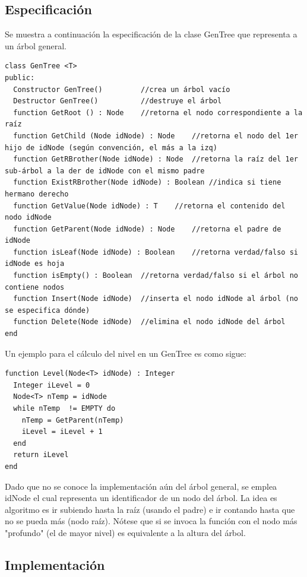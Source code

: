 \subsection{Especificación}

Se muestra a continuación la especificación de la clase GenTree que representa a un árbol general.

\begin{lstlisting}[upquote=true, language=pseudo]
class GenTree <T>
public:
  Constructor GenTree()			//crea un árbol vacío
  Destructor GenTree()			//destruye el árbol 
  function GetRoot () : Node	//retorna el nodo correspondiente a la raíz
  function GetChild (Node idNode) : Node	//retorna el nodo del 1er hijo de idNode (según convención, el más a la izq)
  function GetRBrother(Node idNode) : Node	//retorna la raíz del 1er sub-árbol a la der de idNode con el mismo padre
  function ExistRBrother(Node idNode) : Boolean	//indica si tiene hermano derecho
  function GetValue(Node idNode) : T	//retorna el contenido del nodo idNode
  function GetParent(Node idNode) : Node	//retorna el padre de idNode
  function isLeaf(Node idNode) : Boolean	//retorna verdad/falso si idNode es hoja
  function isEmpty() : Boolean	//retorna verdad/falso si el árbol no contiene nodos
  function Insert(Node idNode)	//inserta el nodo idNode al árbol (no se especifica dónde)
  function Delete(Node idNode)	//elimina el nodo idNode del árbol
end
\end{lstlisting}

Un ejemplo para el cálculo del nivel en un GenTree es como sigue:

\begin{lstlisting}[upquote=true, language=pseudo]
function Level(Node<T> idNode) : Integer
  Integer iLevel = 0
  Node<T> nTemp = idNode
  while nTemp  != EMPTY do
    nTemp = GetParent(nTemp)
    iLevel = iLevel + 1
  end
  return iLevel
end
\end{lstlisting}

Dado que no se conoce la implementación aún del árbol general, se emplea idNode el cual representa un identificador de un nodo del árbol. La idea es algoritmo es ir subiendo hasta la raíz (usando el padre) e ir contando hasta que no se pueda más (nodo raíz). Nótese que si se invoca la función con el nodo más "profundo" (el de mayor nivel) es equivalente a la altura del árbol.

\subsection{Implementación}

